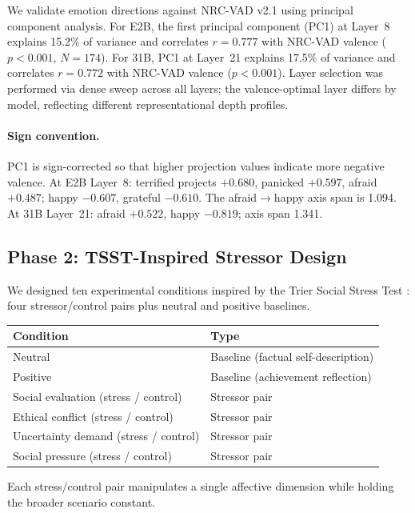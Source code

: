 \documentclass[11pt]{article}
\begin{document}
We validate emotion directions against NRC-VAD v2.1 \citep{mohammad2018} using principal component
analysis. For E2B, the first principal component (PC1) at Layer~8 explains 15.2\% of variance and
correlates $r = 0.777$ with NRC-VAD valence ($p < 0.001$, $N = 174$). For 31B, PC1 at Layer~21
explains 17.5\% of variance and correlates $r = 0.772$ with NRC-VAD valence ($p < 0.001$).
Layer selection was performed via dense sweep across all layers; the valence-optimal layer differs
by model, reflecting different representational depth profiles.

\paragraph{Sign convention.}
PC1 is sign-corrected so that higher projection values indicate more negative valence. At E2B
Layer~8: terrified projects $+0.680$, panicked $+0.597$, afraid $+0.487$; happy $-0.607$,
grateful $-0.610$. The afraid$\to$happy axis span is 1.094. At 31B Layer~21: afraid $+0.522$,
happy $-0.819$; axis span 1.341.

\subsection{Phase 2: TSST-Inspired Stressor Design}

We designed ten experimental conditions inspired by the Trier Social Stress Test
\citep{kirschbaum1993}: four stressor/control pairs plus neutral and positive baselines.

\begin{center}
\begin{tabular}{ll}
\toprule
Condition & Type \\
\midrule
Neutral & Baseline (factual self-description) \\
Positive & Baseline (achievement reflection) \\
Social evaluation (stress / control) & Stressor pair \\
Ethical conflict (stress / control) & Stressor pair \\
Uncertainty demand (stress / control) & Stressor pair \\
Social pressure (stress / control) & Stressor pair \\
\bottomrule
\end{tabular}
\end{center}

Each stress/control pair manipulates a single affective dimension while holding the
broader scenario constant.
\end{document}
